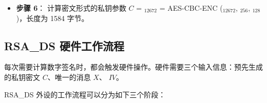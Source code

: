\documentclass[main\_\_CN.tex]{subfiles}
\begin{document}
\begin{itemize}
    \item {\bfseries 步骤 6}：
            计算密文形式的私钥参数 \begin{math}C\end{math} = \begin{math}[C]_{12672}\end{math} =
            AES-CBC-ENC (\begin{math}[P]_{12672}\end{math}, \begin{math}[RSA\_DS\_KEY]_{256}\end{math}, \begin{math}[IV]_{128}\end{math})，长度为 1584 字节。

\end{itemize}

\subsection{RSA\_DS 硬件工作流程}
\label{sec:digsig-hardware-level-operation}

每次需要计算数字签名时，都会触发硬件操作。硬件需要三个输入信息：预先生成的私钥密文 \begin{math}C\end{math}、唯一的消息 \begin{math}X\end{math}、 \begin{math}IV\end{math}。

RSA\_DS 外设的工作流程可以分为如下三个阶段：
\end{document}
